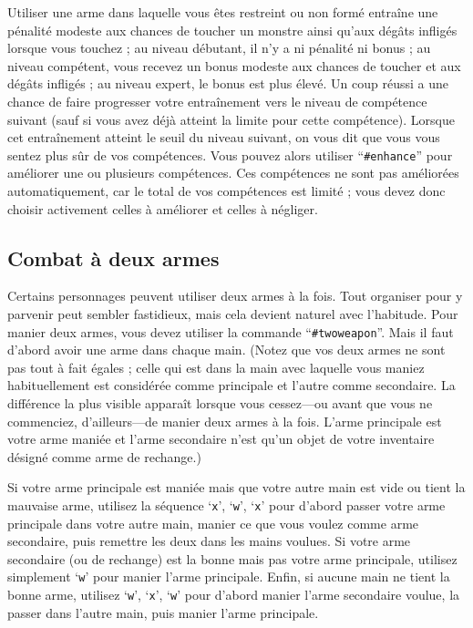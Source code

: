 \documentclass[titlepage]{article}
\begin{document}
Utiliser une arme dans laquelle vous êtes restreint ou non formé
entraîne une pénalité modeste aux chances de toucher un monstre ainsi qu'aux
dégâts infligés lorsque vous touchez ; au niveau débutant, il n'y a ni
pénalité ni bonus ; au niveau compétent, vous recevez un bonus modeste aux
chances de toucher et aux dégâts infligés ; au niveau expert, le bonus est
plus élevé.  Un coup réussi a une chance de faire progresser votre entraînement vers
le niveau de compétence suivant (sauf si vous avez déjà atteint la limite pour cette
compétence).  Lorsque cet entraînement atteint le seuil du niveau suivant,
on vous dit que vous vous sentez plus sûr de vos compétences.  Vous
pouvez alors utiliser ``\texttt{\#enhance}'' pour améliorer une ou plusieurs compétences.
Ces compétences
ne sont pas améliorées automatiquement, car le total de vos compétences
est limité ; vous devez donc choisir activement celles à améliorer
et celles à négliger.

\subsection*{Combat à deux armes}

Certains personnages peuvent utiliser deux armes à la fois.  Tout organiser pour
y parvenir peut sembler fastidieux, mais cela devient naturel avec l'habitude.
Pour manier deux armes, vous devez utiliser la commande ``\texttt{\#twoweapon}''.
Mais il faut d'abord avoir une arme dans chaque main.
(Notez que vos deux armes ne sont pas tout à fait égales ; celle qui est dans la
main avec laquelle vous maniez habituellement est considérée comme principale et
l'autre comme secondaire.
La différence la plus visible apparaît lorsque vous
cessez---ou avant que vous ne commenciez, d'ailleurs---de manier
deux armes à la fois.
L'arme principale est votre arme maniée et l'arme
secondaire n'est qu'un objet de votre inventaire désigné
comme arme de rechange.)

Si votre arme principale est maniée mais que votre autre main est vide ou tient
la mauvaise arme, utilisez la séquence `\texttt{x}', `\texttt{w}', `\texttt{x}' pour
d'abord passer votre arme
principale dans votre autre main, manier ce que vous voulez comme arme
secondaire, puis remettre les deux dans les mains voulues.
Si votre arme secondaire (ou de rechange) est la bonne mais pas votre arme
principale, utilisez simplement `\texttt{w}' pour manier l'arme principale.
Enfin, si aucune main ne tient la bonne arme,
utilisez `\texttt{w}', `\texttt{x}', `\texttt{w}'
pour d'abord manier l'arme secondaire voulue, la passer dans l'autre main, puis
manier l'arme principale.
\end{document}
